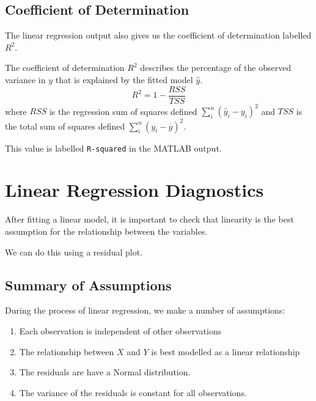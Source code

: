 \documentclass{article}
\begin{document}
\subsection{Coefficient of Determination}
The linear regression output also gives us the coefficient of determination labelled \(R^2\).
\begin{definition}
    The coefficient of determination \(R^2\) describes the percentage of the observed variance
    in \(y\) that is explained by the fitted model \(\hat{y}\).
    \begin{equation*}
        R^2 = 1 - \frac{RSS}{TSS}
    \end{equation*}
    where \(RSS\) is the regression sum of squares defined 
    \(\sum_i^n\left( \hat{y}_i - y_i \right)^2\) and \(TSS\) is the total sum 
    of squares defined \(\sum_i^n \left( y_i - \overline{y} \right)^2\).
\end{definition}
This value is labelled \lstinline!R-squared! in the MATLAB output.
\section{Linear Regression Diagnostics}
After fitting a linear model, it is important to check that linearity is the best assumption for the relationship between the variables.

We can do this using a residual plot.
\subsection{Summary of Assumptions}
During the process of linear regression, we make a number of assumptions:
\begin{enumerate}
    \item Each observation is independent of other observations
    \item The relationship between \(X\) and \(Y\) is best modelled as a linear relationship
    \item The residuals are have a Normal distribution.
    \item The variance of the residuals is constant for all observations.
\end{enumerate}
\end{document}
